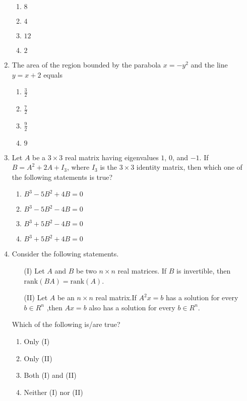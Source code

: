 \documentclass[journal,12pt,onecolumn]{IEEEtran}
\theoremstyle{remark}
\begin{document}
\begin{enumerate}
    \begin{enumerate}
        \item $8$
        \item $4$
        \item $12$ 
        \item $2$
    \end{enumerate}
    \item The area of the region bounded by the parabola $x = -y^2$ and the line $y = x + 2$ equals
    \begin{enumerate}
        \item $\frac{3}{2}$
        \item $\frac{7}{2}$
        \item $\frac{9}{2}$
        \item $9$
    \end{enumerate}
    \item Let $A$ be a $3 \times 3$ real matrix having eigenvalues $1$, $0$, and $-1$. If $B = A^2 + 2A + I_3$, where $I_3$ is the $3 \times 3$ identity matrix, then which one of the following statements is true?
    \begin{enumerate}
        \item $B^3 - 5B^2 + 4B = 0$
        \item $B^3 - 5B^2 - 4B = 0$
        \item $B^3 + 5B^2 - 4B = 0$
        \item $B^3 + 5B^2 + 4B = 0$
    \end{enumerate}
    \item Consider the following statements.
    \begin{enumerate}
    \item[(I)] Let $A$ and $B$ be two $n \times n$ real matrices. If $B$ is invertible, then $\text{rank}(BA) = \text{rank}(A)$.
    \item[(II)] Let $A$ be an $n \times n$ real matrix.If $A^2x=b$ has a solution for every $b\in R^n$ ,then $Ax=b$ also has a solution for every $b\in R^n$.
    \end{enumerate}
    Which of the following is/are true?
    \begin{enumerate}
        \item Only (I)
        \item Only (II)
        \item Both (I) and (II)
        \item Neither (I) nor (II)
    \end{enumerate}
\end{enumerate}
\end{document}
